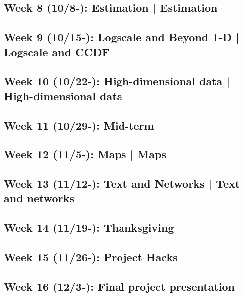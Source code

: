 \documentclass[11pt,article,oneside]{memoir} %
\begin{document}
\subsection{Week 8 (10/8-): Estimation | Estimation }
\subsection{Week 9 (10/15-): Logscale and Beyond 1-D | Logscale and CCDF}
\subsection{Week 10 (10/22-): High-dimensional data | High-dimensional data }
\subsection{Week 11 (10/29-): Mid-term}
\subsection{Week 12 (11/5-): Maps | Maps }
\subsection{Week 13 (11/12-): Text and Networks | Text and networks} 
\subsection{Week 14 (11/19-): Thanksgiving }
\subsection{Week 15 (11/26-): Project Hacks }
\subsection{Week 16 (12/3-): Final project presentation}
\end{document}
